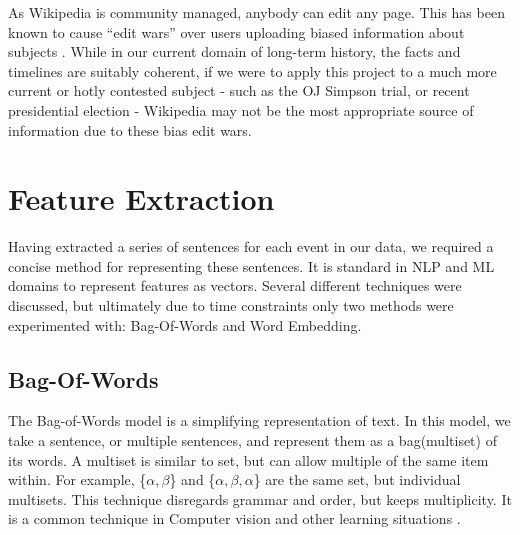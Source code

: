 \documentclass[bsc,frontabs,twoside,singlespacing,parskip,deptreport]{infthesis}     %
\begin{document}
As Wikipedia is community managed, anybody can edit any page. This has been known to cause ``edit wars'' over users
uploading biased information about subjects \cite{}.
While in our current domain of long-term history, the facts and timelines are suitably coherent, if we were to apply this project
to a much more current or hotly contested subject - such as the OJ Simpson trial, or recent presidential election - Wikipedia
may not be the most appropriate source of information due to these bias edit wars.


\section{Feature Extraction}\label{sec:representation}
Having extracted a series of sentences for each event in our data, we required a concise method
for representing these sentences. It is standard in NLP and ML domains to represent features as vectors.
Several different techniques were discussed, but ultimately due to time constraints only two methods were
experimented with: Bag-Of-Words and Word Embedding.
\subsection{Bag-Of-Words}
The Bag-of-Words model is a simplifying representation of text.
In this model, we take a sentence, or multiple sentences, and represent them as a bag(multiset) of its words.
A multiset is similar to set, but can allow multiple of the same item within.
For example, \{$\alpha,\beta$\} and \{$\alpha,\beta,\alpha$\} are the same set, but individual multisets.
This technique disregards grammar and order, but keeps multiplicity. It is a common technique in Computer vision
and other learning situations \cite{sivic2009efficient}.
\end{document}

